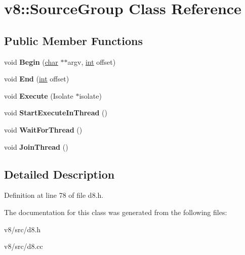 \hypertarget{classv8_1_1SourceGroup}{}\section{v8\+:\+:Source\+Group Class Reference}
\label{classv8_1_1SourceGroup}
\subsection*{Public Member Functions}
\begin{DoxyCompactItemize}
\item 
\mbox{\label{classv8_1_1SourceGroup_a1a4522bd45001d3ee6d4b31547e78783}} 
void {\bfseries Begin} (\mbox{\hyperlink{classchar}{char}} $\ast$$\ast$argv, \mbox{\hyperlink{classint}{int}} offset)
\item 
\mbox{\label{classv8_1_1SourceGroup_a6381d03bcd46b18c3099c3b56a86abae}} 
void {\bfseries End} (\mbox{\hyperlink{classint}{int}} offset)
\item 
\mbox{\label{classv8_1_1SourceGroup_a4d63b7ea2799affcb6df9922535db149}} 
void {\bfseries Execute} (Isolate $\ast$isolate)
\item 
\mbox{\label{classv8_1_1SourceGroup_a6e6a61155ca7c4553a363ce22e755eae}} 
void {\bfseries Start\+Execute\+In\+Thread} ()
\item 
\mbox{\label{classv8_1_1SourceGroup_ab30c676f1939def5c34fa8640ba96172}} 
void {\bfseries Wait\+For\+Thread} ()
\item 
\mbox{\label{classv8_1_1SourceGroup_ac0a4f991ca3daddf06cd5309c002716a}} 
void {\bfseries Join\+Thread} ()
\end{DoxyCompactItemize}


\subsection{Detailed Description}


Definition at line 78 of file d8.\+h.



The documentation for this class was generated from the following files\+:\begin{DoxyCompactItemize}
\item 
v8/src/d8.\+h\item 
v8/src/d8.\+cc\end{DoxyCompactItemize}
